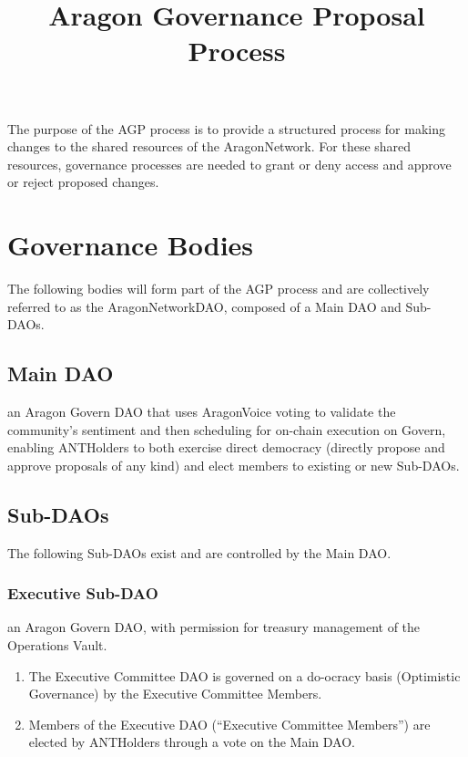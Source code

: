 
\title{Aragon Governance Proposal Process}



\mytitle


The purpose of the \acf{AGP} process is to provide a structured process for making changes to the shared resources of the \gls{AragonNetwork}.
For these shared resources, governance processes are needed to grant or deny access and approve or reject proposed changes.

\section{Governance Bodies}

The following bodies will form part of the \ac{AGP} process and are collectively referred to as the \gls{AragonNetworkDAO}, composed of a Main \ac{DAO} and Sub-\acp{DAO}. 

\subsection{Main \ac{DAO}}

an Aragon Govern \ac{DAO} that uses \gls{AragonVoice} voting to validate the community’s sentiment and then scheduling for on-chain execution on Govern, enabling \glspl{ANTHolder} to both exercise direct democracy (directly propose and approve proposals of any kind) and elect members to existing or new Sub-\acp{DAO}.


\subsection{Sub-\acp{DAO}} 

The following Sub-\acp{DAO} exist and are controlled by the Main \ac{DAO}.


\subsubsection*{Executive Sub-\ac{DAO}}

an Aragon Govern \ac{DAO}, with permission for treasury management of the Operations Vault.
\begin{enumerate}
	\item The Executive Committee \ac{DAO} is governed on a do-ocracy basis (Optimistic Governance) by the Executive Committee Members.
	\item Members of the Executive \ac{DAO} (``Executive Committee Members'') are elected by \glspl{ANTHolder} through a vote on the Main \ac{DAO}.
\end{enumerate}


